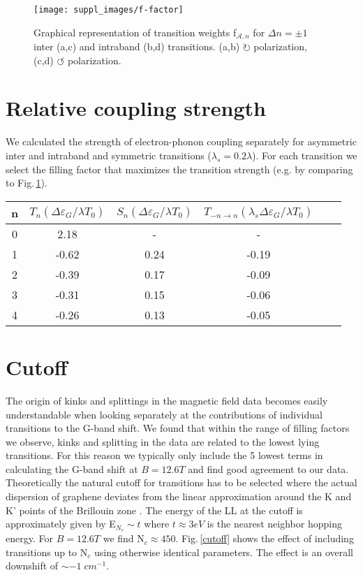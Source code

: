 \documentclass[pra,aps,superscriptaddress,preprint]{revtex4-1}
\begin{document}
\begin{figure}[h!]
   \texttt{[image: suppl\_images/f-factor]}
   \caption{\label{f-factor}Graphical representation of transition weights f$_{\mathcal{A},n}$ for $\Delta n =\pm 1$ inter (a,c) and intraband (b,d) transitions. (a,b) $\circlearrowright$ polarization, (c,d) $\circlearrowleft$ polarization.}
\end{figure}

\newpage
\section{Relative coupling strength}
We calculated the strength of electron-phonon coupling separately for asymmetric inter and intraband and symmetric transitions ($\lambda_s = 0.2\lambda$). For each transition we select the filling factor that maximizes the transition strength (e.g. by comparing to Fig.\,\ref{f-factor}). 

\begin{center}
\begin{tabular}{|c|c|c|c|c|c|}
\hline
n &$T_n \left(\Delta\varepsilon_G / \lambda T_0 \right)$ & $S_n \left(\Delta\varepsilon_G / \lambda T_0 \right)$ & $T_{-n\rightarrow n}\left(\lambda_s \Delta \varepsilon_G / \lambda T_0\right)$ \\\hline
0 & 2.18 & - & - \\\hline
1 &-0.62 & 0.24 &-0.19 \\\hline
2 &-0.39 & 0.17 & -0.09 \\\hline
3 &-0.31 & 0.15 & -0.06 \\\hline
4 &-0.26 & 0.13 & -0.05 \\\hline
\hline
\end{tabular}
\end{center}


\newpage
\section{Cutoff}

The origin of kinks and splittings in the magnetic field data becomes easily understandable when looking separately at the contributions of individual transitions to the G-band shift. We found that within the range of filling factors we observe, kinks and splitting in the data are related to the lowest lying transitions. For this reason we typically only include the 5 lowest terms in calculating the G-band shift at $B=12.6T$ and find good agreement to our data.    
Theoretically the natural cutoff for transitions has to be selected where the actual dispersion of graphene deviates from the linear approximation around the K and K' points of the Brillouin zone \cite{goerbig2011electronic}. The energy of the LL at the cutoff is approximately given by E$_{N_c} \sim t$ where $t\approx 3eV$ is the nearest neighbor hopping energy. For $B=12.6T$ we find N$_c\approx 450$. Fig.\,\ref{cutoff} shows the effect of including transitions up to N$_c$ using otherwise identical parameters. The effect is an overall downshift of $\sim -1\; cm^{-1}$.  
\end{document}
